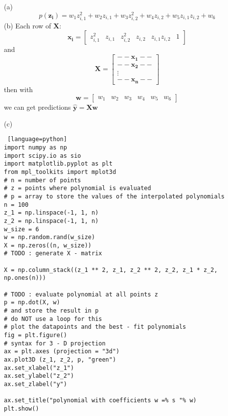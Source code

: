 \documentclass[a4paper, 12pt]{article}
\begin{document}
\begin{problem}

\end{problem}
\begin{solution}
    (a) \[
        p(\mathbf{z_i}) = w_1z_{i, 1}^2 + w_2 z_{i, 1} + w_3 z_{i, 2}^2 + w_4 z_{i, 2} + w_5 z_{i,1}z_{i,2} + w_6
    \]
    (b)
    Each row of $\mathbf{X}$:
    \[
        \mathbf{x_i} = \begin{bmatrix}
            z_{i, 1}^2 & z_{i, 1} & z_{i, 2}^2 & z_{i, 2} & z_{i,1}z_{i,2} & 1
        \end{bmatrix}
    \]
    and \[
    \mathbf{X} = \begin{bmatrix}
        -- \mathbf{x_1} -- \\
        -- \mathbf{x_2} -- \\
        \vdots \\
        -- \mathbf{x_n} --
    \end{bmatrix}
    \]
    then with \[
    \mathbf{w} = \begin{bmatrix}
    w_1 & w_2 & w_3 & w_4 & w_5 & w_6
    \end{bmatrix}
    \]
    we can get predictions $\mathbf{\hat{y}} = \mathbf{Xw}$

    (c)
    \begin{lstlisting} [language=python]
import numpy as np
import scipy.io as sio
import matplotlib.pyplot as plt
from mpl_toolkits import mplot3d
# n = number of points
# z = points where polynomial is evaluated
# p = array to store the values of the interpolated polynomials
n = 100
z_1 = np.linspace(-1, 1, n)
z_2 = np.linspace(-1, 1, n)
w_size = 6
w = np.random.rand(w_size)
X = np.zeros((n, w_size))
# TODO : generate X - matrix

X = np.column_stack((z_1 ** 2, z_1, z_2 ** 2, z_2, z_1 * z_2, np.ones(n)))
    
# TODO : evaluate polynomial at all points z
p = np.dot(X, w)
# and store the result in p
# do NOT use a loop for this
# plot the datapoints and the best - fit polynomials
fig = plt.figure()
# syntax for 3 - D projection
ax = plt.axes (projection = "3d")
ax.plot3D (z_1, z_2, p, "green")
ax.set_xlabel("z_1")
ax.set_ylabel("z_2")
ax.set_zlabel("y")

ax.set_title("polynomial with coefficients w =% s "% w)
plt.show()
    \end{lstlisting}
\end{solution}
\end{document}
